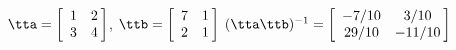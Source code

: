 {$\tta = \left[
\begin{array}{cc}
 1 & 2 \\
 3 & 4
\end{array}\hskip -3pt \right]$, \quad
$\ttb = \left[
\begin{array}{cc}
 7 & 1 \\
 2 & 1
\end{array} \hskip -3pt
\right]$}
{$(\tta\ttb)^{-1} = \left[
\begin{array}{cc}
-7/10 & 3/10 \\
29/10 & -11/10
 \end{array} \hskip -3pt
\right]$}

